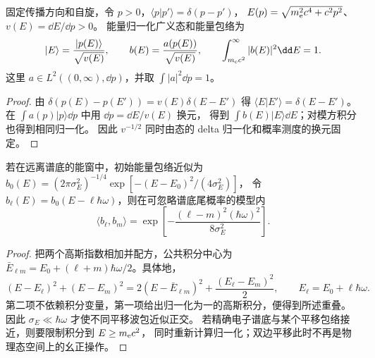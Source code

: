 \begin{definition}[正向电子的能量归一化波包]
固定传播方向和自旋，令 $p>0$，$\langle p|p'\rangle=\delta(p-p')$，
$E(p)=\sqrt{m_{\rm e}^2c^4+c^2p^2}$、$v(E)=\dd E/\dd p>0$。
能量归一化广义态和能量包络为
\begin{equation}
|E\rangle=\frac{|p(E)\rangle}{\sqrt{v(E)}},\qquad
b(E)=\frac{a(p(E))}{\sqrt{v(E)}},\qquad
\int_{m_{\rm e}c^2}^\infty|b(E)|^2\dd E=1.
\label{eq:feqo-energy-envelope-normalization}
\end{equation}
这里 $a\in L^2((0,\infty),\dd p)$，并取 $\int|a|^2\dd p=1$。
\end{definition}
\begin{proof}
由 $\delta(p(E)-p(E'))=v(E)\delta(E-E')$ 得
$\langle E|E'\rangle=\delta(E-E')$。
在 $\int a(p)|p\rangle\dd p$ 中用 $\dd p=\dd E/v(E)$ 换元，
得到 $\int b(E)|E\rangle\dd E$；对模方积分也得到相同归一化。
因此 $v^{-1/2}$ 同时由态的 delta 归一化和概率测度的换元固定。
\end{proof}

\begin{proposition}[能量平移波包之间的重叠]
若在远离谱底的能窗中，初始能量包络近似为
$b_0(E)=(2\pi\sigma_E^2)^{-1/4}\exp[-(E-E_0)^2/(4\sigma_E^2)]$，
令 $b_\ell(E)=b_0(E-\ell\hbar\omega)$，则在可忽略谱底尾概率的模型内
\begin{equation}
\langle b_\ell,b_m\rangle
=\exp\!\left[-\frac{(\ell-m)^2(\hbar\omega)^2}{8\sigma_E^2}\right].
\label{eq:feqo-sideband-wavepacket-overlap}
\end{equation}
\end{proposition}
\begin{proof}
把两个高斯指数相加并配方，公共积分中心为
$\bar E_{\ell m}=E_0+(\ell+m)\hbar\omega/2$。具体地，
\[
(E-E_\ell)^2+(E-E_m)^2
=2(E-\bar E_{\ell m})^2+\frac{(E_\ell-E_m)^2}{2},
\qquad E_\ell=E_0+\ell\hbar\omega.
\]
第二项不依赖积分变量，第一项给出归一化为一的高斯积分，便得到所述重叠。
因此 $\sigma_E\ll\hbar\omega$ 才使不同平移波包近似正交。
若精确电子谱底与某个平移包络接近，则要限制积分到 $E\ge m_{\rm e}c^2$，
同时重新计算归一化；双边平移此时不再是物理态空间上的幺正操作。
\end{proof}

